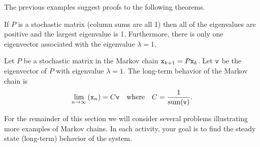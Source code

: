 The previous examples suggest proofs to the following theorems.
\begin{thm}\label{thm:10.7.stochastic_eig}
    If $P$ is a stochastic matrix (column sums are all 1) then all of the eigenvalues are
    positive and the largest eigenvalue is 1. Furthermore, there is only one eigenvector
    associated with the eigenvalue $\lambda=1$.
\end{thm}

\begin{thm}\label{thm:10.7.eig_one}
    Let $P$ be a stochastic matrix in the Markov chain $\texttt{x}_{k+1} = P \texttt{x}_k$.  Let
    $\texttt{v}$ be the eigenvector of $P$ with eigenvalue $\lambda=1$.  The long-term behavior
    of the Markov chain is
    \[ \lim_{n \to \infty} \left( \texttt{x}_n \right) = C \texttt{v} \quad \text{where} \quad C =
        \frac{1}{\text{sum}(\texttt{v})}. \]
\end{thm}

For the remainder of this section we will consider several problems illustrating more
examples of Markov chains.  In each activity, your goal is to find the steady state
(long-term) behavior of the system.

